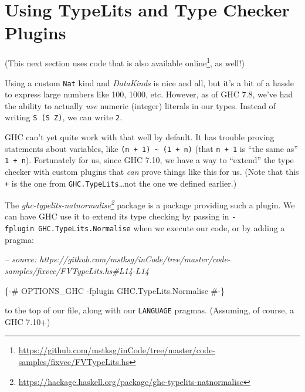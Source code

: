 \documentclass[]{article}
\newenvironment{Shaded}{}{}
\newcommand{\CommentTok}[1]{\textcolor[rgb]{0.38,0.63,0.69}{\textit{#1}}}
\newcommand{\OtherTok}[1]{\textcolor[rgb]{0.00,0.44,0.13}{#1}}
\renewcommand{\href}[2]{#2\footnote{\url{#1}}}
\begin{document}
\hypertarget{using-typelits-and-type-checker-plugins}{%
\section{Using TypeLits and Type Checker
Plugins}\label{using-typelits-and-type-checker-plugins}}

(This next section uses code that is
\href{https://github.com/mstksg/inCode/tree/master/code-samples/fixvec/FVTypeLits.hs}{also
available online}, as well!)

Using a custom \texttt{Nat} kind and \emph{DataKinds} is nice and all, but it's
a bit of a hassle to express large numbers like 100, 1000, etc. However, as of
GHC 7.8, we've had the ability to actually \emph{use} numeric (integer) literals
in our types. Instead of writing \texttt{S\ (S\ Z)}, we can write \texttt{2}.

GHC can't yet quite work with that well by default. It has trouble proving
statements about variables, like
\texttt{(n\ +\ 1)\ \textasciitilde{}\ (1\ +\ n)} (that \texttt{n\ +\ 1} is ``the
same as'' \texttt{1\ +\ n}). Fortunately for us, since GHC 7.10, we have a way
to ``extend'' the type checker with custom plugins that \emph{can} prove things
like this for us. (Note that this \texttt{+} is the one from
\texttt{GHC.TypeLits}\ldots{}not the one we defined earlier.)

The
\emph{\href{https://hackage.haskell.org/package/ghc-typelits-natnormalise}{ghc-typelits-natnormalise}}
package is a package providing such a plugin. We can have GHC use it to extend
its type checking by passing in \texttt{-fplugin\ GHC.TypeLits.Normalise} when
we execute our code, or by adding a pragma:

\begin{Shaded}
\begin{Highlighting}[]
\CommentTok{-- source: https://github.com/mstksg/inCode/tree/master/code-samples/fixvec/FVTypeLits.hs#L14-L14}

\OtherTok{\{-# OPTIONS_GHC -fplugin GHC.TypeLits.Normalise #-\}}
\end{Highlighting}
\end{Shaded}

to the top of our file, along with our \texttt{LANGUAGE} pragmas. (Assuming, of
course, a GHC 7.10+)
\end{document}
